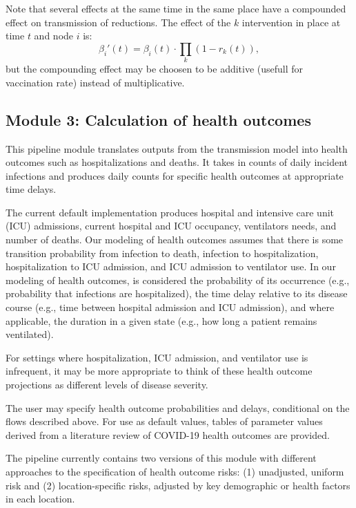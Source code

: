 {Note that several effects at the same time in the same place have a compounded effect on transmission of reductions. The effect of the $k$ intervention in place at time $t$ and node $i$ is:
\begin{equation}
	\beta_i'(t) =  \beta_i(t) \cdot  \prod_k \left(1-r_k(t) \right), \label{eq:npi_comp}
\end{equation}
but the compounding effect may be choosen to be additive (\ie usefull for vaccination rate) instead of multiplicative.

\subsection{Module 3: Calculation of health outcomes}
This pipeline module translates outputs from the transmission model into health outcomes such as hospitalizations and deaths. It takes in counts of daily incident infections and produces daily counts for specific health outcomes at appropriate time delays.

The current default implementation produces hospital and intensive care unit (ICU) admissions, current hospital and ICU occupancy, ventilators needs, and number of deaths. Our modeling of health outcomes assumes that there is some transition probability from infection to death, infection to hospitalization, hospitalization to ICU admission, and ICU admission to ventilator use. In our modeling of health outcomes, is considered the probability of its occurrence (e.g., probability that infections are hospitalized), the time delay relative to its disease course (e.g., time between hospital admission and ICU admission), and where applicable, the duration in a given state (e.g., how long a patient remains ventilated).

For settings where hospitalization, ICU admission, and ventilator use is infrequent, it may be more appropriate to think of these health outcome projections as different levels of disease severity.

The user may specify health outcome probabilities and delays, conditional on the flows described above. For use as default values, tables of parameter values derived from a literature review of COVID-19 health outcomes are provided.

The pipeline currently contains two versions of this module with different approaches to the specification of health outcome risks: (1) unadjusted, uniform risk and (2) location-specific risks, adjusted by key demographic or health factors in each location.

}
